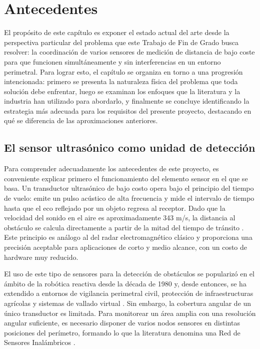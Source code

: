 \chapter{Antecedentes}
\label{Antecedentes}

El propósito de este capítulo es exponer el estado actual del arte desde la perspectiva particular del problema que este Trabajo de Fin de Grado busca resolver: la coordinación de varios sensores de medición de distancia de bajo coste para que funcionen simultáneamente y sin interferencias en un entorno perimetral. Para lograr esto, el capítulo se organiza en torno a una progresión intencionada: primero se presenta la naturaleza física del problema que toda solución debe enfrentar, luego se examinan los enfoques que la literatura y la industria han utilizado para abordarlo, y finalmente se concluye identificando la estrategia más adecuada para los requisitos del presente proyecto, destacando en qué se diferencia de las aproximaciones anteriores.

\section{El sensor ultrasónico como unidad de detección}

Para comprender adecuadamente los antecedentes de este proyecto, es conveniente explicar primero el funcionamiento del elemento sensor en el que se basa. Un transductor ultrasónico de bajo costo opera bajo el principio del tiempo de vuelo: emite un pulso acústico de alta frecuencia y mide el intervalo de tiempo hasta que el eco reflejado por un objeto regresa al receptor. Dado que la velocidad del sonido en el aire es aproximadamente 343 m/s, la distancia al obstáculo se calcula directamente a partir de la mitad del tiempo de tránsito \cite{7}. Este principio es análogo al del radar electromagnético clásico \cite{6} y proporciona una precisión aceptable para aplicaciones de corto y medio alcance, con un costo de hardware muy reducido.

El uso de este tipo de sensores para la detección de obstáculos se popularizó en el ámbito de la robótica reactiva desde la década de 1980 \cite{8} y, desde entonces, se ha extendido a entornos de vigilancia perimetral civil, protección de infraestructuras agrícolas \cite{14} y sistemas de vallado virtual \cite{15}. Sin embargo, la cobertura angular de un único transductor es limitada. Para monitorear un área amplia con una resolución angular suficiente, es necesario disponer de varios nodos sensores en distintas posiciones del perímetro, formando lo que la literatura denomina una Red de Sensores Inalámbricos \cite{3}.

